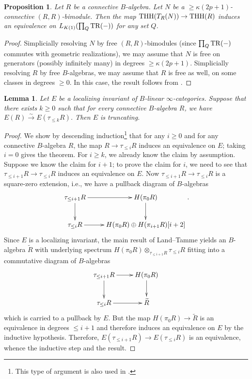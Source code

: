 \documentclass{amsart}
\newtheorem{lemma}[theorem]{Lemma}
\newtheorem{proposition}[theorem]{Proposition}
\theoremstyle{definition}
\begin{document}
\begin{proposition} 
\label{lK1TR2}
Let $R$ be a connective $B$-algebra. 
Let $N$ be a $\geq \kappa(2p+1)$-connective $(R, R)$-bimodule. 
Then the map 
$\mathrm{THH}( T_R(N)) \to \mathrm{THH}(R)$ induces an equivalence on 
$L_{K(1)} (\prod_Q \mathrm{TR}(-))$ for any set $Q$. 
\end{proposition} 
\begin{proof} 
Simplicially resolving $N$ by free $(R, R)$-bimodules (since $\prod_Q \mathrm{TR}(-)$ commutes with
geometric realizations), 
we may assume that $N$ is free on generators (possibly infinitely many) in
degrees $\geq \kappa(2p+1)$. 
Simplicially resolving $R$ by free $B$-algebras, we may assume that $R$ is free as
well, on some classes in degrees $\geq 0$. 
In this case, the result follows from 
.
\end{proof} 


\begin{lemma} 
\label{ktruncatingimpliestruncating}
Let $E$ be a localizing invariant of $B$-linear $\infty$-categories. 
Suppose that there exists $k \geq 0$ such that for every connective $B$-algebra $R$, we have 
$E( R) \xrightarrow{\sim} E( \tau_{\leq k} R)$. 
Then $E$ is truncating. 
\end{lemma} 
\begin{proof}
We show by descending induction\footnote{This type of argument is also used
in \cite[Sec.~3.2]{LMT}.} that for any $i \geq 0$ and for any connective
$B$-algebra $R$, the map 
$R \to \tau_{\leq i} R$
induces an equivalence on $E$; taking $i = 0$ gives the theorem. 
For $i \geq k$, we already know the claim by assumption. 
Suppose we know the claim for $i+1$; to prove the claim for $i$, we need to see
that $\tau_{\leq i+1} R \to \tau_{\leq i} R $ induces an equivalence on
$E$. 
Now $\tau_{\leq i+1} R \to \tau_{\leq i} R$ is a square-zero extension, i.e., we
have a pullback diagram of $B$-algebras
\[ \xymatrix{
\tau_{\leq i + 1} R \ar[d]  \ar[r] & H(\pi_0 R) \ar[d]  \\
\tau_{\leq i } R \ar[r] &  H(\pi_0 R) \oplus H ( \pi_{i+1} R)[i+2]
}.\]
Since $E$ is a localizing invariant, 
the main result of Land--Tamme \cite{LT19} 
yields an $B$-algebra $\widetilde{R}$ with underlying spectrum 
$H(\pi_0 R) \otimes_{\tau_{\leq i+1} R } \tau_{\leq i} R$ fitting into a
commutative diagram
of $B$-algebras
\[  \xymatrix{
\tau_{\leq i+1} R \ar[d]  \ar[r] &  H(\pi_0 R) \ar[d]  \\
\tau_{\leq i} R \ar[r] &  \widetilde{R}
}\]
which is carried to a pullback by $E$. 
But the map $H(\pi_0 R) \to \widetilde{R}$ is an equivalence in degrees $\leq
i+1$ and therefore induces an equivalence on $E$ by the inductive
hypothesis. 
Therefore, $E( \tau_{\leq i+1} R) \to E( \tau_{\leq i} R)$
is an equivalence, whence the inductive step and the result. 
\end{proof} 
\end{document}
